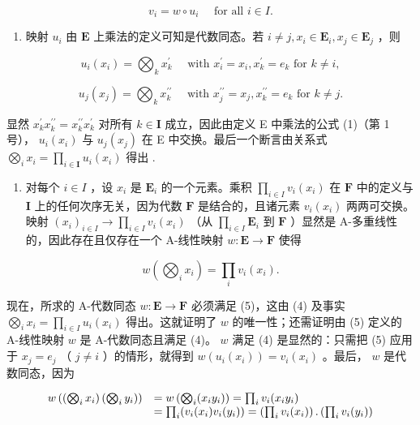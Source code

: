 \[
v _ {i} = w \circ u _ {i} \quad \text { for all } i \in I.\tag{4}
\]

\begin{enumerate}
\def\labelenumi{(\roman{enumi})}
\tightlist
\item
  映射 \(u_{i}\) 由 \(\mathbf{E}\) 上乘法的定义可知是代数同态。若 \(i \neq j, x_{i} \in \mathbf{E}_{i}, x_{j} \in \mathbf{E}_{j}\) ，则
\end{enumerate}

\[
u _ {i} (x _ {i}) = \bigotimes_ {k} x _ {k} ^ {\prime} \quad \text { with } x _ {i} ^ {\prime} = x _ {i}, x _ {k} ^ {\prime} = e _ {k} \text { for } k \neq i,
\]

\[
u _ {j} (x _ {j}) = \bigotimes_ {k} x _ {k} ^ {\prime \prime} \quad \text { with } x _ {j} ^ {\prime \prime} = x _ {j}, x _ {k} ^ {\prime \prime} = e _ {k} \text { for } k \neq j.
\]

显然 \(x_{k}^{\prime}x_{k}^{\prime \prime} = x_{k}^{\prime \prime}x_{k}^{\prime}\) 对所有 \(k\in \mathbf{I}\) 成立，因此由定义 E 中乘法的公式 (1)（第 1 号）， \(u_{i}(x_{i})\) 与 \(u_{j}(x_{j})\) 在 E 中交换。最后一个断言由关系式 \(\bigotimes_{i}x_{i} = \prod_{i\in \mathbf{I}}u_{i}(x_{i})\) 得出 .

\begin{enumerate}
\def\labelenumi{(\roman{enumi})}
\setcounter{enumi}{1}
\tightlist
\item
  对每个 \(i \in I\) ，设 \(x_{i}\) 是 \(\mathbf{E}_{i}\) 的一个元素。乘积 \(\prod_{i \in I} v_{i}(x_{i})\) 在 \(\mathbf{F}\) 中的定义与 \(\mathbf{I}\) 上的任何次序无关，因为代数 \(\mathbf{F}\) 是结合的，且诸元素 \(v_{i}(x_{i})\) 两两可交换。映射 \((x_{i})_{i \in I} \to \prod_{i \in I} v_{i}(x_{i})\) （从 \(\prod_{i \in I} \mathbf{E}_{i}\) 到 \(\mathbf{F}\) ）显然是 A-多重线性的，因此存在且仅存在一个 A-线性映射 \(w: \mathbf{E} \to \mathbf{F}\) 使得
\end{enumerate}

\[
w \left(\bigotimes_ {i} x _ {i}\right) = \prod_ {i} v _ {i} \left(x _ {i}\right).\tag{5}
\]

现在，所求的 A-代数同态 \(w: \mathbf{E} \to \mathbf{F}\) 必须满足 (5)，这由 (4) 及事实 \(\bigotimes_{i} x_i = \prod_{i \in I} u_i(x_i)\) 得出。这就证明了 \(w\) 的唯一性；还需证明由 (5) 定义的 A-线性映射 \(w\) 是 A-代数同态且满足 (4)。 \(w\) 满足 (4) 是显然的：只需把 (5) 应用于 \(x_j = e_j\) （ \(j \neq i\) ）的情形，就得到 \(w(u_i(x_i)) = v_i(x_i)\) 。最后， \(w\) 是代数同态，因为

\[
\begin{array}{r l} w \left(\left(\bigotimes_ {i} x _ {i}\right) \left(\bigotimes_ {i} y _ {i}\right)\right) & = w \left(\bigotimes_ {i} (x _ {i} y _ {i})\right) = \prod_ {i} v _ {i} (x _ {i} y _ {i}) \\ & = \prod_ {i} (v _ {i} (x _ {i}) v _ {i} (y _ {i})) = \left(\prod_ {i} v _ {i} (x _ {i})\right). \left(\prod_ {i} v _ {i} (y _ {i})\right) \end{array}
\]

